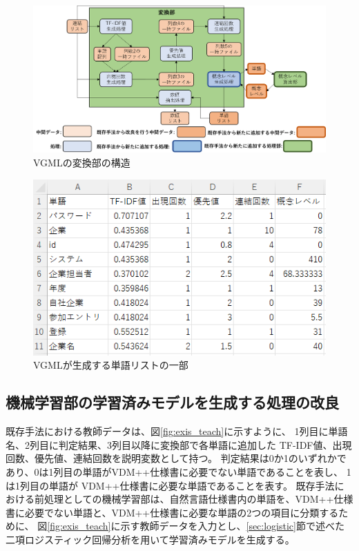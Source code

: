 \begin{figure}[t]
    \begin{center}
        \includegraphics[width=1.0\columnwidth]{image/vgml_transfer.png}
        \caption{VGMLの変換部の構造}
        \label{fig:vgml_transfer}
    \end{center}
\end{figure}

\begin{figure}[t]
    \begin{center}
        \includegraphics[width=1.0\columnwidth]{image/vgml_word_list.png}
        \caption{VGMLが生成する単語リストの一部}
        \label{fig:vgml_word_list}
    \end{center}
\end{figure}

\subsection{機械学習部の学習済みモデルを生成する処理の改良}
\label{sec:vgml_train_model}
既存手法における教師データは、図\ref{fig:exis_teach}に示すように、
1列目に単語名、2列目に判定結果、3列目以降に変換部で各単語に追加した TF-IDF値、出現回数、優先値、連結回数を説明変数として持つ。
判定結果は0か1のいずれかであり、0は1列目の単語がVDM++仕様書に必要でない単語であることを表し、
1は1列目の単語が VDM++仕様書に必要な単語であることを表す。
既存手法における前処理としての機械学習部は、自然言語仕様書内の単語を、VDM++仕様書に必要でない単語と、VDM++仕様書に必要な単語の2つの項目に分類するために、
図\ref{fig:exis_teach}に示す教師データを入力とし、\ref{sec:logistic}節で述べた二項ロジスティック回帰分析を用いて学習済みモデルを生成する。

